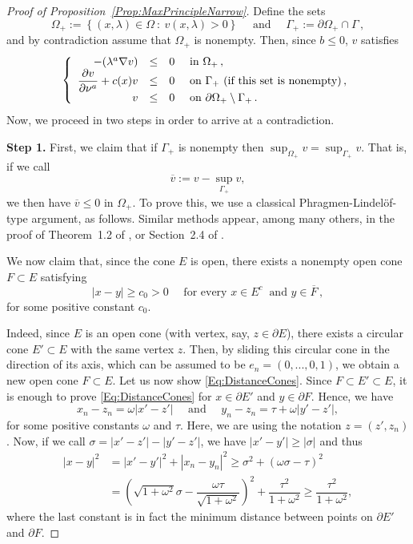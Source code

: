 \documentclass[12pt,reqno]{amsart}
\theoremstyle{definition}
\theoremstyle{remark}
\newcommand\beqc[1]{\left\{\begin{array}{#1}}
\newcommand\eeqc{\end{array} \right.}
\def\PDEsystem{rcll}
\let\div\relax
\DeclareMathOperator{\div}{div}
\numberwithin{equation}{section}
\begin{document}
\begin{proof}[Proof of Proposition~\ref{Prop:MaxPrincipleNarrow}] 
	Define the sets 
	$$
	\Omega_+ := \left\{(x,\lambda) \in \Omega \ : \ v(x,\lambda)>0 \right\} 
	\quad \text{ and } \quad 
	\Gamma_+ := \partial \Omega_+ \cap \Gamma\,,
	$$ 
	and by contradiction assume that $\Omega_+$ is nonempty. Then, since $b\leq 0$,  $v$ satisfies
	$$
	\beqc{\PDEsystem}
	-\div(\lambda^a \nabla v) &\leq& 0 & \text{ in } \Omega_+\,, \\
	\dfrac{\partial v}{\partial \nu^a}  + c(x) v &\leq & 0 & \text{ on } \Gamma_+ \text{ (if this set is nonempty)}\,, \\
	v & \leq & 0 & \text{ on } \partial \Omega_+ \setminus \Gamma_+\,.
	\eeqc
	$$
	Now, we proceed in two steps in order to arrive at a contradiction.
	
	\textbf{Step 1.}
	First, we claim that if $\Gamma_+$ is nonempty then $\sup_{\Omega_+} v = \sup_{\Gamma_+} v $. That is, if we call 
	$$
	\overline{v} := v - \sup_{\Gamma_+} v,
	$$
	we then have $\overline{v} \leq 0$ in $\Omega_+$. To prove this, we use a classical Phragmen-Lindelöf-type argument, as follows. Similar methods appear, among many others, in the proof of Theorem~1.2 of \cite{BerestyckiCaffarelliNiremberg-Monotonicity}, or Section~2.4 of \cite{CabreSolaMorales}.
	
	We now claim that, since the cone $E$ is open, there exists a nonempty open cone $F \subset E$ satisfying
	\begin{equation}
	\label{Eq:DistanceCones}
	|x-y| \geq c_0 > 0 \quad \text{ for every } x\in E^c \ \text{ and } y \in \overline{F}\,,
	\end{equation}
	for some positive constant $c_0$.
	
	Indeed, since $E$ is an open cone (with vertex, say, $z\in \partial E$), there exists a circular cone $E'\subset E$ with the same vertex $z$. Then, by sliding this circular cone in the direction of its axis, which can be assumed to be $e_n = (0,...,0,1)$, we obtain a new open cone $F\subset E$. Let us now show \eqref{Eq:DistanceCones}. Since $F \subset E' \subset E$, it is enough to prove \eqref{Eq:DistanceCones} for $x\in \partial E'$ and $ y\in\partial F$. Hence, we have
	$$x_n-z_n = \omega |x'-z'| \quad \text{ and } \quad y_n-z_n = \tau + \omega |y'-z'|, $$
	for some positive constants $\omega$ and $\tau$. Here, we are using the notation $z = (z',z_n)$. Now, if we call $\sigma = |x'-z'|-|y'-z'|$, we have $|x'-y'|\geq |\sigma|$ and thus
	\begin{align*}
	|x-y|^2 &= |x'-y'|^2 + |x_n-y_n|^2 \geq \sigma^2 + (\omega \sigma - \tau)^2   \\
	&= \left ( \sqrt{1+\omega^2} \sigma - \dfrac{\omega\tau}{\sqrt{1+\omega^2}}\right )^2 + \dfrac{\tau^2}{1+\omega^2}\geq\dfrac{\tau^2}{1+\omega^2},
	\end{align*}
	where the last constant is in fact the minimum distance between points on $\partial E'$ and $\partial F$. 
	

\end{proof}
\end{document}
